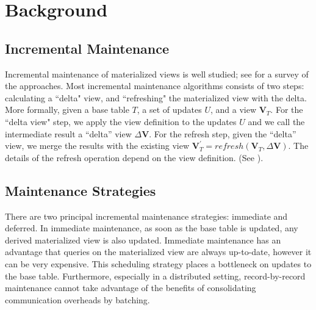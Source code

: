 \section{Background}\label{sec-background}
\vspace{-.5em}
\subsection{Incremental Maintenance}\label{subsec-inc}
Incremental maintenance of materialized views is well studied; see \cite{chirkova2011materialized} for a survey of the approaches. 
Most incremental maintenance algorithms consists of two steps: calculating a ``delta" view,
and ``refreshing" the materialized view with the delta.
More formally, given a base table $T$, a set of updates $U$,
and a view $\textbf{V}_{T}$.
For the ``delta view" step, we apply the view definition to the updates $U$ and we call
the intermediate result a ``delta'' view $\Delta\textbf{V}$.
For the refresh step, given the ``delta'' view, we merge the results with the existing
view $\textbf{V}_{T}^{'}=refresh(\textbf{V}_{T},\Delta\textbf{V})$.
The details of the refresh operation depend on the view definition.
(See \cite{chirkova2011materialized}).



\subsection{Maintenance Strategies}
There are two principal incremental maintenance strategies: immediate and deferred. 
In immediate maintenance, as soon as the base table is updated, 
any derived materialized view is also updated.
Immediate maintenance has an advantage that queries on the materialized view are always up-to-date, 
however it can be very expensive.
This scheduling strategy places a bottleneck on updates to the base table.
Furthermore, especially in a distributed setting, record-by-record 
maintenance cannot take advantage of the benefits of consolidating communication overheads by batching.

